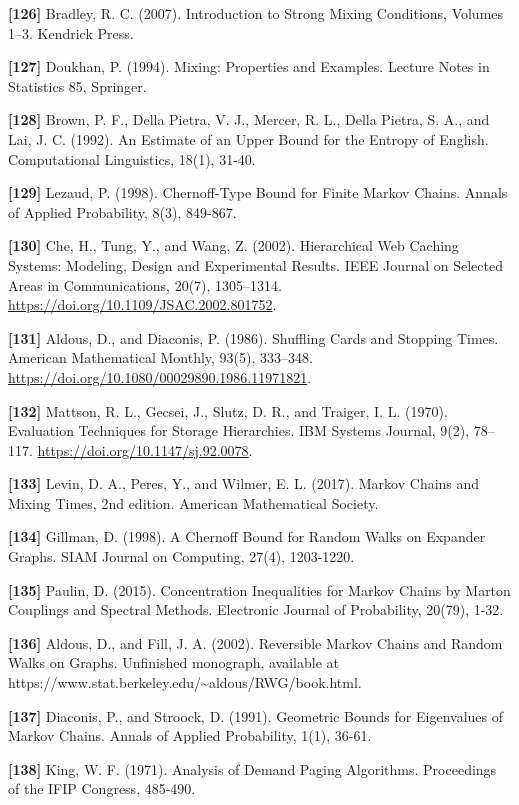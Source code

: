 \documentclass[
]{article}
\begin{document}
\textbf{{[}126{]}} Bradley, R. C. (2007). Introduction to Strong
Mixing Conditions, Volumes 1--3. Kendrick Press.

\textbf{{[}127{]}} Doukhan, P. (1994). Mixing: Properties and
Examples. Lecture Notes in Statistics 85, Springer.

\textbf{{[}128{]}} Brown, P. F., Della Pietra, V. J., Mercer,
R. L., Della Pietra, S. A., and Lai, J. C. (1992). An Estimate of
an Upper Bound for the Entropy of English. Computational Linguistics,
18(1), 31-40.

\textbf{{[}129{]}} Lezaud, P. (1998). Chernoff-Type Bound for Finite
Markov Chains. Annals of Applied Probability, 8(3), 849-867.

\textbf{{[}130{]}} Che, H., Tung, Y., and Wang,
Z. (2002). Hierarchical Web Caching Systems: Modeling, Design and
Experimental Results. IEEE Journal on Selected Areas in Communications,
20(7), 1305--1314. \url{https://doi.org/10.1109/JSAC.2002.801752}.

\textbf{{[}131{]}} Aldous, D., and
Diaconis, P. (1986). Shuffling Cards and Stopping Times. American
Mathematical Monthly, 93(5), 333--348.
\url{https://doi.org/10.1080/00029890.1986.11971821}.

\textbf{{[}132{]}} Mattson, R. L., Gecsei, J., Slutz,
D. R., and Traiger, I. L. (1970). Evaluation Techniques for Storage
Hierarchies. IBM Systems Journal, 9(2), 78--117.
\url{https://doi.org/10.1147/sj.92.0078}.

\textbf{{[}133{]}} Levin, D. A., Peres, Y., and Wilmer, E. L. (2017).
Markov Chains and Mixing Times, 2nd edition. American Mathematical
Society.

\textbf{{[}134{]}} Gillman, D. (1998). A Chernoff Bound for Random
Walks on Expander Graphs. SIAM Journal on Computing, 27(4),
1203-1220.

\textbf{{[}135{]}} Paulin, D. (2015). Concentration Inequalities
for Markov Chains by Marton Couplings and Spectral Methods.
Electronic Journal of Probability, 20(79), 1-32.

\textbf{{[}136{]}} Aldous, D., and Fill, J. A. (2002).
Reversible Markov Chains and Random Walks on Graphs.
Unfinished monograph, available at
https://www.stat.berkeley.edu/\textasciitilde aldous/RWG/book.html.

\textbf{{[}137{]}} Diaconis, P., and Stroock, D. (1991). Geometric
Bounds for Eigenvalues of Markov Chains. Annals of Applied
Probability, 1(1), 36-61.

\textbf{{[}138{]}} King, W. F. (1971). Analysis of Demand Paging
Algorithms. Proceedings of the IFIP Congress, 485-490.
\end{document}
